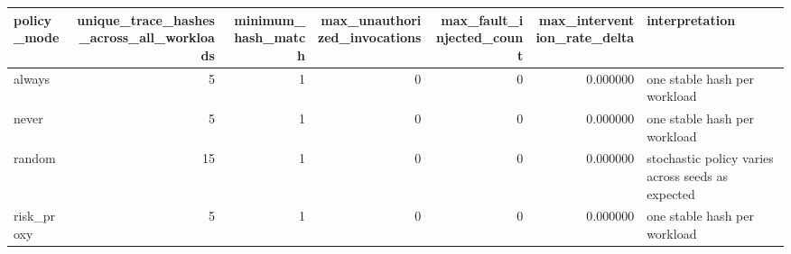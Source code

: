 \begin{tabular}{lrrrrrl}
\toprule
policy\_mode & unique\_trace\_hashes\_across\_all\_workloads & minimum\_hash\_match & max\_unauthorized\_invocations & max\_fault\_injected\_count & max\_intervention\_rate\_delta & interpretation \\
\midrule
always & 5 & 1 & 0 & 0 & 0.000000 & one stable hash per workload \\
never & 5 & 1 & 0 & 0 & 0.000000 & one stable hash per workload \\
random & 15 & 1 & 0 & 0 & 0.000000 & stochastic policy varies across seeds as expected \\
risk\_proxy & 5 & 1 & 0 & 0 & 0.000000 & one stable hash per workload \\
\bottomrule
\end{tabular}
